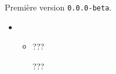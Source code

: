 Première version \verb+0.0.0-beta+.

\begin{itemize}[itemsep=.5em]
    \item {}
    \begin{itemize}[itemsep=.5em]
        \item ???

              \smallskip

              ???
    \end{itemize}





    \separation
\end{itemize}